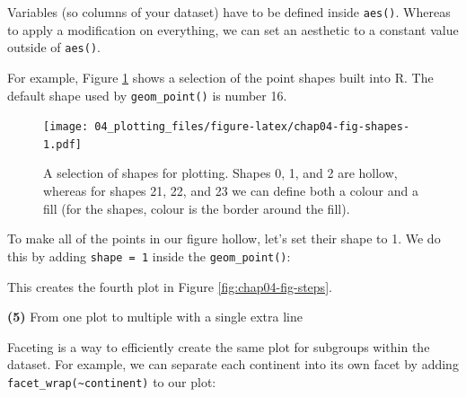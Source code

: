 \documentclass[
  12pt,
  krantz2]{krantz}
\makeatletter
\newenvironment{Shaded}{\begin{snugshade}}{\end{snugshade}}
\newcommand{\DataTypeTok}[1]{\textcolor[rgb]{0.13,0.29,0.53}{#1}}
\newcommand{\DecValTok}[1]{\textcolor[rgb]{0.00,0.00,0.81}{#1}}
\newcommand{\KeywordTok}[1]{\textcolor[rgb]{0.13,0.29,0.53}{\textbf{#1}}}
\newcommand{\NormalTok}[1]{#1}
\newcommand{\OperatorTok}[1]{\textcolor[rgb]{0.81,0.36,0.00}{\textbf{#1}}}
\newcommand{\StringTok}[1]{\textcolor[rgb]{0.31,0.60,0.02}{#1}}
\newenvironment{kframe}{%
\medskip{}
\setlength{\fboxsep}{.8em}
 \def\at@end@of@kframe{}%
 \ifinner\ifhmode%
  \def\at@end@of@kframe{\end{minipage}}%
  \begin{minipage}{\columnwidth}%
 \fi\fi%
 \def\FrameCommand##1{\hskip\@totalleftmargin \hskip-\fboxsep
 \colorbox{shadecolor}{##1}\hskip-\fboxsep
     \hskip-\linewidth \hskip-\@totalleftmargin \hskip\columnwidth}%
 \MakeFramed {\advance\hsize-\width
   \@totalleftmargin\z@ \linewidth\hsize
   \@setminipage}}%
 {\par\unskip\endMakeFramed%
 \at@end@of@kframe}
\renewenvironment{Shaded}{\begin{kframe}}{\end{kframe}}
\makeatother
\begin{document}
Variables (so columns of your dataset) have to be defined inside \texttt{aes()}.
Whereas to apply a modification on everything, we can set an aesthetic to a constant value outside of \texttt{aes()}.

For example, Figure \ref{fig:chap04-fig-shapes} shows a selection of the point shapes built into R. The default shape used by \texttt{geom\_point()} is number 16.

\begin{figure}
\centering
\texttt{[image: 04\_plotting\_files/figure-latex/chap04-fig-shapes-1.pdf]}
\caption{\label{fig:chap04-fig-shapes}A selection of shapes for plotting. Shapes 0, 1, and 2 are hollow, whereas for shapes 21, 22, and 23 we can define both a colour and a fill (for the shapes, colour is the border around the fill).}
\end{figure}

To make all of the points in our figure hollow, let's set their shape to 1.
We do this by adding \texttt{shape\ =\ 1} inside the \texttt{geom\_point()}:

\begin{Shaded}
\end{Shaded}

This creates the fourth plot in Figure \ref{fig:chap04-fig-steps}.

\textbf{(5)} From one plot to multiple with a single extra line

Faceting is a way to efficiently create the same plot for subgroups within the dataset.
For example, we can separate each continent into its own facet by adding \texttt{facet\_wrap(\textasciitilde{}continent)} to our plot:

\begin{Shaded}
\end{Shaded}
\end{document}

